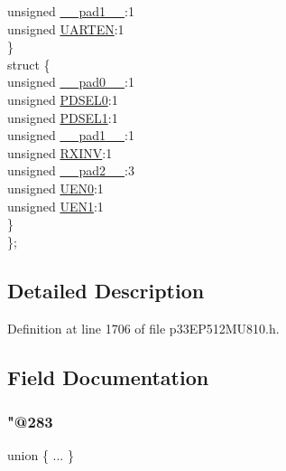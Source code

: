 \begin{DoxyCompactItemize}
\begin{tabbing}
\>\>unsigned \hyperlink{structtag_u2_m_o_d_e_b_i_t_s_acaf2d0924a107ec6e8d2e31febaf66f9}{\_\_pad1\_\_}:1\\
\>\>unsigned \hyperlink{structtag_u2_m_o_d_e_b_i_t_s_a71c27a2a2a21a1e41f5d969caaedc4ce}{UARTEN}:1\\
\>\} \\
\>struct \{\\
\>\>unsigned \hyperlink{structtag_u2_m_o_d_e_b_i_t_s_adf71f3d8410c1f1dbbc96680a92c49af}{\_\_pad0\_\_}:1\\
\>\>unsigned \hyperlink{structtag_u2_m_o_d_e_b_i_t_s_a3b06981d12ef9472672b5afa3fcb1096}{PDSEL0}:1\\
\>\>unsigned \hyperlink{structtag_u2_m_o_d_e_b_i_t_s_abd9cead9920f08c4dffa97b0c9210cbc}{PDSEL1}:1\\
\>\>unsigned \hyperlink{structtag_u2_m_o_d_e_b_i_t_s_acaf2d0924a107ec6e8d2e31febaf66f9}{\_\_pad1\_\_}:1\\
\>\>unsigned \hyperlink{structtag_u2_m_o_d_e_b_i_t_s_a53e5f9028d2bcb77dfd7b2cdb49809fe}{RXINV}:1\\
\>\>unsigned \hyperlink{structtag_u2_m_o_d_e_b_i_t_s_a4d97cc5f7d51d22fc2bf3eab35c9cb7f}{\_\_pad2\_\_}:3\\
\>\>unsigned \hyperlink{structtag_u2_m_o_d_e_b_i_t_s_acdbd7f8b51f26e512915a94d8d8f6c0d}{UEN0}:1\\
\>\>unsigned \hyperlink{structtag_u2_m_o_d_e_b_i_t_s_ab3c4d77b59c26a79b60548ef7ea7fd38}{UEN1}:1\\
\>\} \\
\}; \\

\end{tabbing}\end{DoxyCompactItemize}


\subsection{Detailed Description}


Definition at line 1706 of file p33\+E\+P512\+M\+U810.\+h.



\subsection{Field Documentation}
\mbox{\label{structtag_u2_m_o_d_e_b_i_t_s_abca97f33d3e42f494a21e5d8a5cffe1a}} 
\subsubsection{\texorpdfstring{"@283}{@283}}
{\footnotesize\ttfamily union \{ ... \} }

